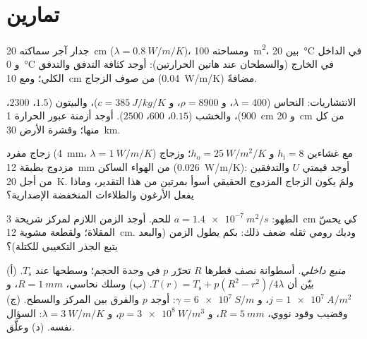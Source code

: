 \section{تمارين}

\begin{exercise}[$\star$]\label{exo:b2:heat-conduction:1}
جدار آجر سماكته \qty{20}{cm} ($\lambda = \qty{0.8}{W/m/K}$)، ومساحته \qty{100}{m^2}،
بين \qty{20}{\celsius} في الداخل و \qty{0}{\celsius} في الخارج
(والسطحان عند هاتين الحرارتين): أوجد كثافة التدفق والتدفق الكلي؛ ومع
\qty{10}{cm} من صوف الزجاج (\qty{0.04}{W/m/K}) مضافةً.
\end{exercise}

\begin{exercise}[$\star$]\label{exo:b2:heat-conduction:2}
الانتشاريات: النحاس ($\lambda = 400$، و $\rho = 8900$، و $c = \qty{385}{J/kg/K}$)،
والبيتون ($1.5$، $2300$، $900$)، والخشب ($0.15$، $600$، $2500$). أوجد أزمنة عبور الحرارة
\qty{1}{cm} و \qty{20}{cm} من كل منها؛ وقشرة الأرض \qty{30}{km}.
\end{exercise}

\begin{exercise}[$\star$]\label{exo:b2:heat-conduction:3}
زجاج مفرد (\qty{4}{mm}، $\lambda = \qty{1}{W/m/K}$) مع غشاءين $h_{\text{i}}
= 8$ و $h_{\text{o}} = \qty{25}{W/m^2/K}$؛ وزجاج مزدوج بطبقة \qty{12}{mm}
من الهواء الساكن (\qty{0.026}{W/m/K}): أوجد قيمتي $U$ والتدفقين من أجل
\qty{20}{K}. ولمَ يكون الزجاج المزدوج الحقيقي أسوأ بمرتين من هذا
التقدير، وماذا يفعل الأرغون والطلاءات المنخفضة الإصدارية؟
\end{exercise}

\begin{exercise}[$\star$]\label{exo:b2:heat-conduction:4}
الطهو: $a = \qty{1.4e-7}{m^2/s}$ للحم. أوجد الزمن اللازم لمركز
شريحة \qty{3}{cm} كي يحسّ المقلاة؛ ولقطعة مشوية \qty{12}{cm}. وديك رومي
ثقله ضعف ذلك: بكم يطول الزمن (والبعد يتبع الجذر التكعيبي
للكتلة)؟
\end{exercise}

\begin{exercise}[$\star\star$]\label{exo:b2:heat-conduction:5}
\emph{منبع داخلي.} أسطوانة نصف قطرها $R$ تحرّر $p$ في وحدة
الحجم؛ وسطحها عند $T_{\text{s}}$. (أ) بيّن أن $T(r) = T_{\text{s}} +
p(R^2 - r^2)/4\lambda$. (ب) وسلك نحاسي، $R = \qty{1}{mm}$، و $j =
\qty{1e7}{A/m^2}$، و $\gamma = \qty{6e7}{S/m}$: أوجد $p$ والفرق بين المركز
والسطح. (ج) وقضيب وقود نووي، $R = \qty{5}{mm}$، و $p = \qty{3e8}{W/m^3}$،
و $\lambda = \qty{3}{W/m/K}$: السؤال نفسه. (د) وعلّق.
\end{exercise}

